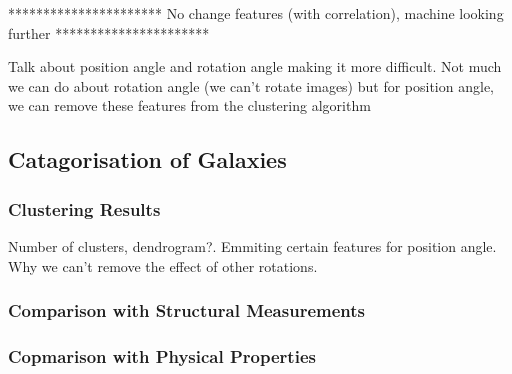 \documentclass[12pt, onecolumn]{article}
\begin{document}
        \vspace{5mm}

        \vspace{5mm}

        **********************
        No change features (with correlation), machine looking further
        **********************

        \vspace{5mm}
        

        Talk about position angle and rotation angle making it more difficult. Not much we can do about rotation angle (we can't rotate images) but for position angle, we can remove these features from the clustering algorithm
        


    \subsection{Catagorisation of Galaxies}

        \subsubsection{Clustering Results}
        \label{Clustering Results}

        Number of clusters, dendrogram?. Emmiting certain features for position angle. Why we can't remove the effect of other rotations.
        
        \subsubsection{Comparison with Structural Measurements}
        \label{Structual Clusters}


        
        \subsubsection{Copmarison with Physical Properties}
        \label{Physical Clusters}

        


    
\end{document}
